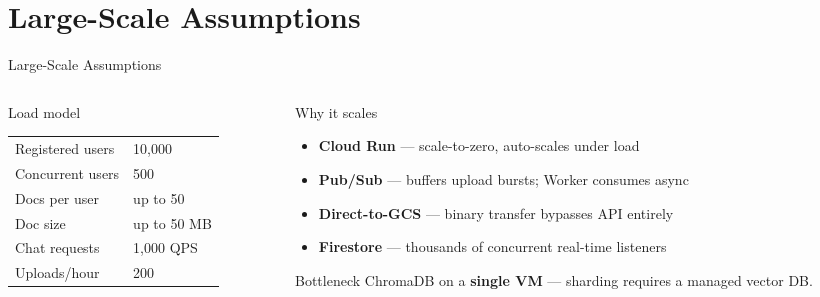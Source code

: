 \documentclass[aspectratio=169]{beamer}
\begin{document}
\section{Large-Scale Assumptions}

\begin{frame}[t,shrink=3]{Large-Scale Assumptions}
  \begin{columns}[t]
    \begin{column}{0.44\textwidth}
      \begin{block}{Load model}
        {\small\renewcommand{\arraystretch}{1.2}
        \begin{tabular}{@{}ll@{}}
          Registered users  & 10{,}000 \\
          Concurrent users  & 500 \\
          Docs per user     & up to 50 \\
          Doc size          & up to 50 MB \\
          Chat requests     & 1{,}000 QPS \\
          Uploads/hour      & 200 \\
        \end{tabular}}
      \end{block}
    \end{column}
    \begin{column}{0.52\textwidth}
      \begin{block}{Why it scales}
        \begin{itemize}\setlength\itemsep{0.2em}
          \item \textbf{Cloud Run} — scale-to-zero,
                auto-scales under load
          \item \textbf{Pub/Sub} — buffers upload bursts;
                Worker consumes async
          \item \textbf{Direct-to-GCS} — binary transfer
                bypasses API entirely
          \item \textbf{Firestore} — thousands of concurrent
                real-time listeners
        \end{itemize}
      \end{block}
      \vspace{0.2cm}
      \begin{alertblock}{Bottleneck}
        {\small ChromaDB on a \textbf{single VM} — sharding
        requires a managed vector DB.}
      \end{alertblock}
    \end{column}
  \end{columns}
\end{frame}
\end{document}
